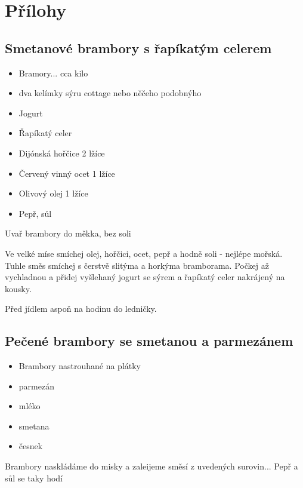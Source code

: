 \documentclass[10pt,a4paper]{article}
\newenvironment{myitemize}
{ \begin{itemize}
    \setlength{\itemsep}{0pt}
    \setlength{\parskip}{0pt}
    \setlength{\parsep}{0pt}     }
{ \end{itemize}                  }
\begin{document}
\section{Přílohy}
\subsection{Smetanové brambory s řapíkatým celerem}
\begin{minipage}[t]{0,5\textwidth}
\begin{myitemize} 
\item Bramory... cca kilo
\item dva kelímky sýru cottage nebo něčeho podobnýho
\item Jogurt
\item Řapíkatý celer
\item Dijónská hořčice 2 lžíce
\item Červený vinný ocet 1 lžíce
\item Olivový olej 1 lžíce
\item Pepř, sůl
\end{myitemize}
\end{minipage}
\begin{minipage}[t]{0,5\textwidth}
Uvař brambory do měkka, bez soli

Ve velké míse smíchej olej, hořčici, ocet, pepř a hodně soli - nejlépe mořská. Tuhle směs smíchej s čerstvě slitýma a horkýma bramborama. Počkej až vychladnou a přidej vyšlehaný jogurt se sýrem a řapíkatý celer nakrájený na kousky.

Před jídlem aspoň na hodinu do ledničky.
\end{minipage}
\subsection{Pečené brambory se smetanou a parmezánem}
\begin{minipage}[t]{0,5\textwidth}
\begin{myitemize} 
\item Brambory nastrouhané na plátky
\item parmezán
\item mléko
\item smetana
\item česnek
\end{myitemize}
\end{minipage}
\begin{minipage}[t]{0,5\textwidth}
Brambory naskládáme do misky a zaleijeme směsí z uvedených surovin... Pepř a sůl se taky hodí 
\end{minipage}
\end{document}
